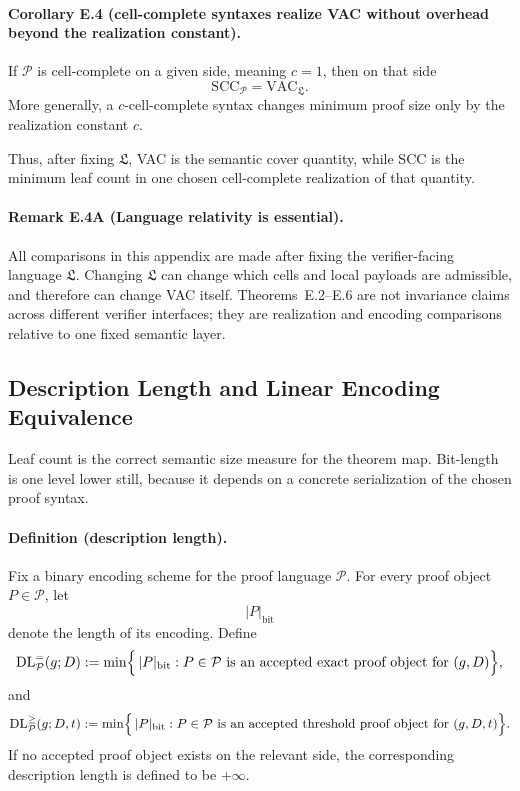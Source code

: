 \paragraph{Corollary E.4 (cell-complete syntaxes realize VAC without overhead beyond the realization constant).}
If $\mathcal P$ is cell-complete on a given side, meaning $c=1$, then on that side
\[
\mathrm{SCC}_{\mathcal P}=\mathrm{VAC}_{\mathfrak L}.
\]
More generally, a $c$-cell-complete syntax changes minimum proof size only by the realization constant $c$.

Thus, after fixing $\mathfrak L$, VAC is the semantic cover quantity, while SCC is the minimum leaf count in one chosen cell-complete realization of that quantity.

\paragraph{Remark E.4A (Language relativity is essential).}
All comparisons in this appendix are made after fixing the verifier-facing language $\mathfrak L$. Changing $\mathfrak L$ can change which cells and local payloads are admissible, and therefore can change VAC itself. Theorems~E.2--E.6 are not invariance claims across different verifier interfaces; they are realization and encoding comparisons relative to one fixed semantic layer.

\subsection{Description Length and Linear Encoding Equivalence}

Leaf count is the correct semantic size measure for the theorem map. Bit-length is one level lower still, because it depends on a concrete serialization of the chosen proof syntax.

\paragraph{Definition (description length).}
Fix a binary encoding scheme for the proof language $\mathcal P$. For every proof object $P\in\mathcal P$, let
\[
|P|_{\mathrm{bit}}
\]
denote the length of its encoding. Define
\[
\mathrm{DL}^{=}_{\mathcal P}(g;D)
:=
\min\Bigl\{\,|P|_{\mathrm{bit}}:
P\in\mathcal P\text{ is an accepted exact proof object for }(g,D)\Bigr\},
\]
and
\[
\mathrm{DL}^{\ge}_{\mathcal P}(g;D,t)
:=
\min\Bigl\{\,|P|_{\mathrm{bit}}:
P\in\mathcal P\text{ is an accepted threshold proof object for }(g,D,t)\Bigr\}.
\]
If no accepted proof object exists on the relevant side, the corresponding description length is defined to be $+\infty$.

